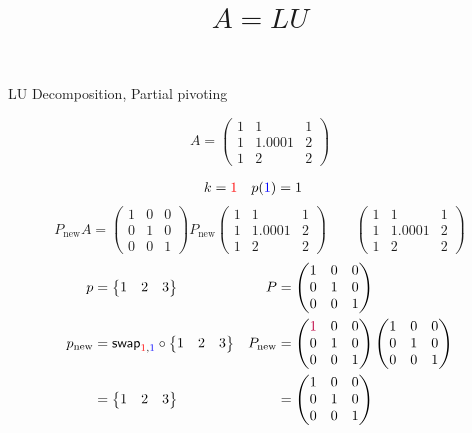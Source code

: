 \documentclass[pdf]{beamer}
\title{$A=LU$}
\subtitle{}
\author{}
\begin{document}
\begin{frame}{}
\begin{center}LU Decomposition, Partial pivoting\end{center} $$A = \begin{pmatrix}1&1&1\\1&1.0001&2\\1&2&2\end{pmatrix}$$\end{frame}
\begin{frame}{}\begin{align*} k &= {\color{red}1} & p({\color{blue}1}) &= 1\end{align*} $$P_{\text{new}}A=\begin{pmatrix}1&0&0\\0&1&0\\0&0&1\end{pmatrix} P_{\text{new}} \begin{pmatrix}\boxed{1}&1&1\\1&1.0001&2\\1&2&2\end{pmatrix} \quad\quad \begin{pmatrix}1&1&1\\1&1.0001&2\\1&2&2\end{pmatrix}$$ \begin{align*} p&= \begin{Bmatrix}1&2&3\end{Bmatrix} & P&= \begin{pmatrix}1&0&0\\0&1&0\\0&0&1\end{pmatrix}\\ p_{\text{new}} &= \mathsf{swap}_{{\color{red}1},{\color{blue}1}} \circ \begin{Bmatrix}1&2&3\end{Bmatrix} & P_{\text{new}} &= \begin{pmatrix}{\color{purple}1}&0&0\\0&1&0\\0&0&1\end{pmatrix} \begin{pmatrix}1&0&0\\0&1&0\\0&0&1\end{pmatrix}\\ &=\begin{Bmatrix}1&2&3\end{Bmatrix} &&=\begin{pmatrix}1&0&0\\0&1&0\\0&0&1\end{pmatrix}\end{align*}\end{frame}
\end{document}
